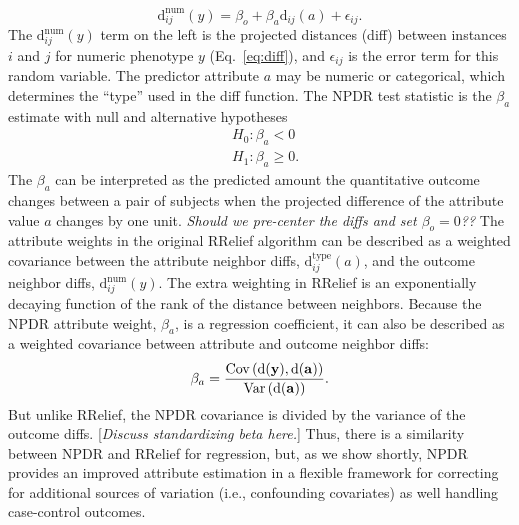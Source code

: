 \documentclass[10pt]{article}
\begin{document}
%
%
\begin{equation}\label{eq:lin_reg}
    \text{d}^{\text{num}}_{ij}(y) = \beta_{o} + \beta_{a} \text{d}_{ij}(a) + \epsilon_{ij}.
\end{equation}
The $\text{d}^{\text{num}}_{ij}(y)$ term on the left is the projected distances (diff) between instances $i$ and $j$ for numeric phenotype $y$ (Eq.~\ref{eq:diff}), and $\epsilon_{ij}$ is the error term for this random variable. The predictor attribute $a$ may be numeric or categorical, which determines the ``type'' used in the diff function. The NPDR test statistic is the $\beta_a$ estimate with null and alternative hypotheses
\begin{equation}\label{eq:linreg_null}
\begin{aligned}
    & H_0: \beta_a < 0 \\
    & H_1: \beta_a \ge 0.
\end{aligned}
\end{equation}
The $\beta_a$ can be interpreted as the predicted amount the quantitative outcome changes between a pair of subjects when the projected difference of the attribute value $a$ changes by one unit. {\it Should we pre-center the diffs and set $\beta_o=0$??} The attribute weights in the original RRelief algorithm can be described as a weighted covariance between the attribute neighbor diffs, $\text{d}^{\text{type}}_{ij}(a)$, and the outcome neighbor diffs, $\text{d}^{\text{num}}_{ij}(y)$. The extra weighting in RRelief is an exponentially decaying function of the rank of the distance between neighbors. Because the NPDR attribute weight, $\beta_a$, is a regression coefficient, it can also be described as a weighted covariance between attribute and outcome neighbor diffs:
\begin{equation}
\beta_a = \frac{\text{Cov}\left( \bf{\text{d}}(\bf{y}), \bf{\text{d}}(\bf{a}) \right)} {\text{Var}\left( \bf{\text{d}}(\bf{a}) \right)}.
\end{equation}
But unlike RRelief, the NPDR covariance is divided by the variance of the outcome diffs. [\emph{Discuss standardizing beta here.}] Thus, there is a similarity between NPDR and RRelief for regression, but, as we show shortly, NPDR provides an improved attribute estimation in a flexible framework for correcting for additional sources of variation (i.e., confounding covariates) as well handling case-control outcomes.   
\end{document}
